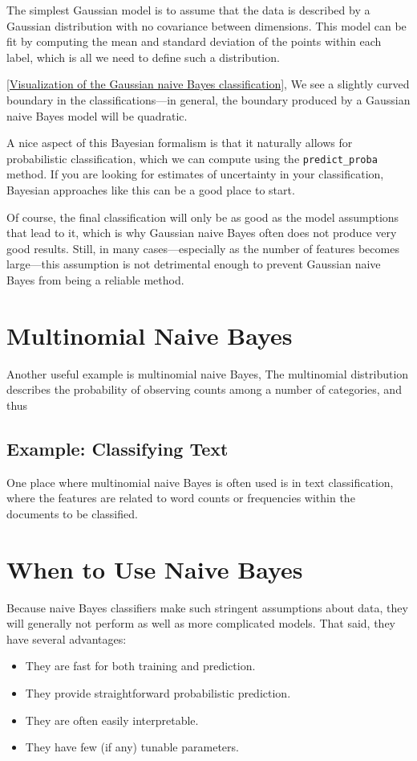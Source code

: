 The simplest Gaussian model is to assume that the data is described by a Gaussian
distribution with no covariance between dimensions. This model can be fit by computing the mean and standard deviation of the points within each label, which is all
we need to define such a distribution.


\autoref{Visualization of the Gaussian naive Bayes classification}, We see a slightly curved boundary in the classifications—in general, the boundary
produced by a Gaussian naive Bayes model will be quadratic.

A nice aspect of this Bayesian formalism is that it naturally allows for probabilistic classification, which we can compute using the \verb|predict_proba| method. If you are looking for estimates of uncertainty in your classification, Bayesian
approaches like this can be a good place to start.

Of course, the final classification will only be as good as the model assumptions that
lead to it, which is why Gaussian naive Bayes often does not produce very good
results. Still, in many cases—especially as the number of features becomes large—this
assumption is not detrimental enough to prevent Gaussian naive Bayes from being a
reliable method.

\section{Multinomial Naive Bayes}
Another useful example is multinomial naive Bayes,  The multinomial distribution describes the probability of observing counts among a number of categories, and thus 
\subsection*{Example: Classifying Text}
One place where multinomial naive Bayes is often used is in text classification, where
the features are related to word counts or frequencies within the documents to be
classified.

\section{When to Use Naive Bayes}
Because naive Bayes classifiers make such stringent assumptions about data, they will
generally not perform as well as more complicated models. That said, they have several advantages:
\begin{itemize}
    \item They are fast for both training and prediction.
    \item They provide straightforward probabilistic prediction.
    \item They are often easily interpretable.
    \item They have few (if any) tunable parameters.
\end{itemize}

